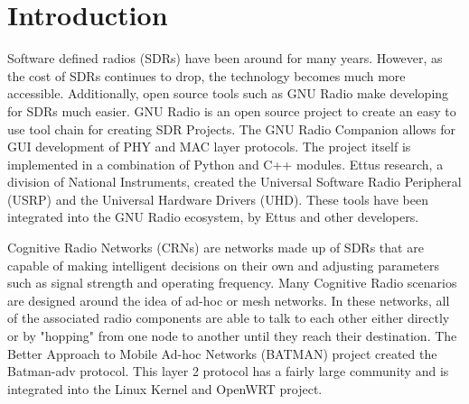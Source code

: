 \section{Introduction}

Software defined radios (SDRs) have been around for many years. However, as the cost of SDRs
continues to drop, the technology becomes much more accessible. Additionally, open source
tools such as GNU Radio make developing for SDRs much easier. GNU Radio is an open source
project to create an easy to use tool chain for creating SDR Projects. The GNU Radio
Companion allows for GUI development of PHY and MAC layer protocols. The project itself
is implemented in a combination of Python and C++ modules. Ettus research, a division of 
National Instruments, created the Universal Software Radio Peripheral (USRP) and the Universal
Hardware Drivers (UHD). These tools have been integrated into the GNU Radio ecosystem, by
Ettus and other developers.  

Cognitive Radio Networks (CRNs) are networks made up of SDRs that are capable of making 
intelligent decisions on their own and adjusting parameters such as signal strength and 
operating frequency. Many Cognitive Radio scenarios are designed around the idea of ad-hoc or mesh
networks. In these networks, all of the associated radio components are able to talk to each
other either directly or by "hopping" from one node to another until they reach their destination. 
The Better Approach to Mobile Ad-hoc Networks (BATMAN) project created the Batman-adv protocol. 
This layer 2 protocol has a fairly large community and is integrated into the Linux Kernel and OpenWRT
project. 

